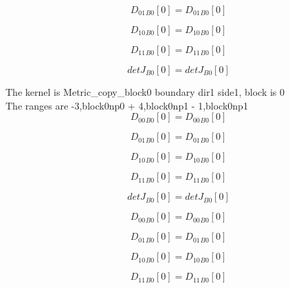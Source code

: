 \documentclass{article}
\begin{document}
\begin{dmath}{D_{01}{_{B0}}}[{0}] = {D_{01}{_{B0}}}[{0}]\end{dmath}

\begin{dmath}{D_{10}{_{B0}}}[{0}] = {D_{10}{_{B0}}}[{0}]\end{dmath}

\begin{dmath}{D_{11}{_{B0}}}[{0}] = {D_{11}{_{B0}}}[{0}]\end{dmath}

\begin{dmath}{detJ{_{B0}}}[{0}] = {detJ{_{B0}}}[{0}]\end{dmath}

\noindent The kernel is Metric_copy_block0 boundary dir1 side1, block is 0\\\noindent The ranges are -3,block0np0 + 4,block0np1 - 1,block0np1\\\begin{dmath}{D_{00}{_{B0}}}[{0}] = {D_{00}{_{B0}}}[{0}]\end{dmath}

\begin{dmath}{D_{01}{_{B0}}}[{0}] = {D_{01}{_{B0}}}[{0}]\end{dmath}

\begin{dmath}{D_{10}{_{B0}}}[{0}] = {D_{10}{_{B0}}}[{0}]\end{dmath}

\begin{dmath}{D_{11}{_{B0}}}[{0}] = {D_{11}{_{B0}}}[{0}]\end{dmath}

\begin{dmath}{detJ{_{B0}}}[{0}] = {detJ{_{B0}}}[{0}]\end{dmath}

\begin{dmath}{D_{00}{_{B0}}}[{0}] = {D_{00}{_{B0}}}[{0}]\end{dmath}

\begin{dmath}{D_{01}{_{B0}}}[{0}] = {D_{01}{_{B0}}}[{0}]\end{dmath}

\begin{dmath}{D_{10}{_{B0}}}[{0}] = {D_{10}{_{B0}}}[{0}]\end{dmath}

\begin{dmath}{D_{11}{_{B0}}}[{0}] = {D_{11}{_{B0}}}[{0}]\end{dmath}
\end{document}
